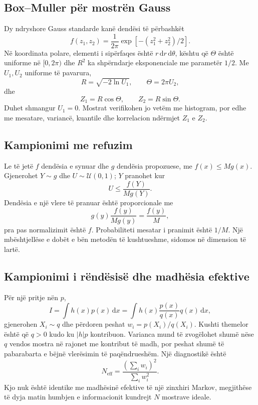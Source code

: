 \documentclass[11pt,oneside,openany]{book}
\newcommand{\dd}{\,\mathrm{d}}
\begin{document}
\subsection{Box--Muller për mostrën Gauss}
Dy ndryshore Gauss standarde kanë dendësi të përbashkët
\begin{equation}
 f(z_1,z_2)=\frac{1}{2\pi}\exp[-(z_1^2+z_2^2)/2].
\end{equation}
Në koordinata polare, elementi i sipërfaqes është $r\dd r\dd\theta$, kështu që $\Theta$ është uniforme në $[0,2\pi)$ dhe $R^2$ ka shpërndarje eksponenciale me parametër $1/2$. Me $U_1,U_2$ uniforme të pavarura,
\begin{equation}
 R=\sqrt{-2\ln U_1},\qquad \Theta=2\pi U_2,
\end{equation}
dhe
\begin{equation}
 Z_1=R\cos\Theta,\qquad Z_2=R\sin\Theta.
\end{equation}
Duhet shmangur $U_1=0$. Mostrat verifikohen jo vetëm me histogram, por edhe me mesatare, variancë, kuantile dhe korrelacion ndërmjet $Z_1$ e $Z_2$.

\subsection{Kampionimi me refuzim}
Le të jetë $f$ dendësia e synuar dhe $g$ dendësia propozuese, me $f(x)\le Mg(x)$. Gjenerohet $Y\sim g$ dhe $U\sim\mathcal U(0,1)$; $Y$ pranohet kur
\begin{equation}
 U\le\frac{f(Y)}{Mg(Y)}.
\end{equation}
Dendësia e një vlere të pranuar është proporcionale me
\begin{equation}
 g(y)\frac{f(y)}{Mg(y)}=\frac{f(y)}{M},
\end{equation}
pra pas normalizimit është $f$. Probabiliteti mesatar i pranimit është $1/M$. Një mbështjellëse e dobët e bën metodën të kushtueshme, sidomos në dimension të lartë.

\subsection{Kampionimi i rëndësisë dhe madhësia efektive}
Për një pritje nën $p$,
\begin{equation}
 I=\int h(x)p(x)\dd x
 =\int h(x)\frac{p(x)}{q(x)}q(x)\dd x,
\end{equation}
gjenerohen $X_i\sim q$ dhe përdoren peshat $w_i=p(X_i)/q(X_i)$. Kushti themelor është që $q>0$ kudo ku $|h|p$ kontribuon. Varianca mund të zvogëlohet shumë nëse $q$ vendos mostra në rajonet me kontribut të madh, por peshat shumë të pabarabarta e bëjnë vlerësimin të paqëndrueshëm. Një diagnostikë është
\begin{equation}
 N_{\mathrm{eff}}=\frac{(\sum_iw_i)^2}{\sum_iw_i^2}.
\end{equation}
Kjo nuk është identike me madhësinë efektive të një zinxhiri Markov, megjithëse të dyja matin humbjen e informacionit kundrejt $N$ mostrave ideale.
\end{document}

